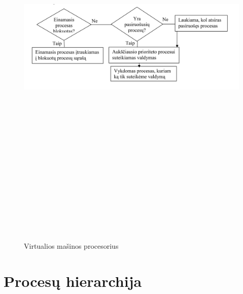 \documentclass[oneside]{VUMIFPSkursinis}
\begin{document}
\begin{figure}[H]
		\centering	
	\includegraphics[width=18cm,height=20cm,keepaspectratio]{ProcesuVeikimas.png}
	\caption{Virtualios mašinos procesorius}
	\label{fig:Virtualios mašinos procesorius}
\end{figure}

\section{Procesų hierarchija}
\end{document}
